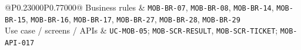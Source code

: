 \begin{longtable}{@{}P{0.23000\SRSWidth}P{0.77000\SRSWidth}@{}}
Business rules & \texttt{MOB-\allowbreak{}BR-\allowbreak{}07}, \texttt{MOB-\allowbreak{}BR-\allowbreak{}08}, \texttt{MOB-\allowbreak{}BR-\allowbreak{}14}, \texttt{MOB-\allowbreak{}BR-\allowbreak{}15}, \texttt{MOB-\allowbreak{}BR-\allowbreak{}16}, \texttt{MOB-\allowbreak{}BR-\allowbreak{}17}, \texttt{MOB-\allowbreak{}BR-\allowbreak{}27}, \texttt{MOB-\allowbreak{}BR-\allowbreak{}28}, \texttt{MOB-\allowbreak{}BR-\allowbreak{}29} \\[3pt]
Use case /\allowbreak{} screens /\allowbreak{} APIs & \texttt{UC-\allowbreak{}MOB-\allowbreak{}05}; \texttt{MOB-\allowbreak{}SCR-\allowbreak{}RESULT}, \texttt{MOB-\allowbreak{}SCR-\allowbreak{}TICKET}; \texttt{MOB-\allowbreak{}API-\allowbreak{}017} \\[3pt]
\end{longtable}
\endgroup

